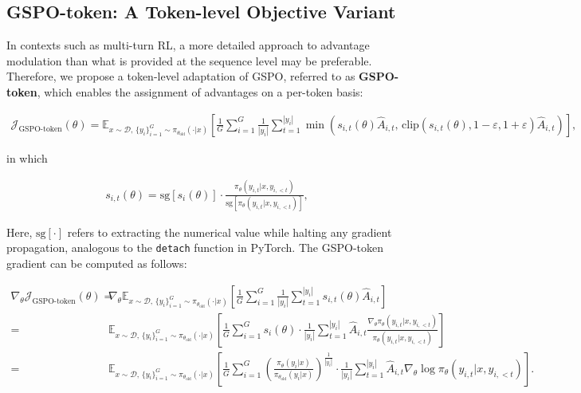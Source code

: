\subsection{GSPO-token: A Token-level Objective Variant}

In contexts such as multi-turn RL, a more detailed approach to advantage modulation than what is provided at the sequence level may be preferable. Therefore, we propose a token-level adaptation of GSPO, referred to as \textbf{GSPO-token}, which enables the assignment of advantages on a per-token basis:

\begin{align}
\mathcal{J}_\text{GSPO-token}(\theta)
=
\mathbb{E}_{ x \sim \mathcal{D},\, \{y_i\}_{i=1}^G \sim \pi_{\theta_\text{old}}( \cdot | x) }
\left[ 
\frac{1}{G} \sum_{i=1}^{G} \frac{1}{|y_i|} \sum_{t=1}^{|y_i|} 
\min \left( s_{i,t}(\theta) \widehat{A}_{i,t},  \, \mathrm{clip} \left( s_{i,t}(\theta), 1 - {\varepsilon}, 1 + {\varepsilon} \right) \widehat{A}_{i,t} \right) 
\right],
\label{equ:gspo-token}
\end{align}

in which

\begin{align}
s_{i,t}(\theta) 
= \mathrm{sg} \left[ s_{i}(\theta) \right]  \cdot \frac{ \pi_{\theta} (y_{i,t} | x, y_{i,<t}) }{ \mathrm{sg} \left[ \pi_{\theta} (y_{i,t} | x, y_{i,<t}) \right] },
\end{align}

Here, $\mathrm{sg}[\cdot]$ refers to extracting the numerical value while halting any gradient propagation, analogous to the \texttt{detach} function in PyTorch. The GSPO-token gradient can be computed as follows:

\begin{align}
\nabla_{\theta} \mathcal{J}_\text{GSPO-token}(\theta)
=&\ 
\nabla_{\theta} \mathbb{E}_{ x \sim \mathcal{D},\, \{y_i\}_{i=1}^G \sim \pi_{\theta_\text{old}}( \cdot | x) }
\left[ 
\frac{1}{G} \sum_{i=1}^{G}
\frac{1}{|y_i|} \sum_{t=1}^{|y_i|} 
s_{i,t}(\theta) \widehat{A}_{i,t}
\right] \\
=&\ 
\mathbb{E}_{ x \sim \mathcal{D},\, \{y_i\}_{i=1}^G \sim \pi_{\theta_\text{old}}( \cdot | x) }
\left[ 
\frac{1}{G} \sum_{i=1}^{G} s_i (\theta) \cdot \frac{1}{|y_i|} \sum_{t=1}^{|y_i|} 
\widehat{A}_{i,t} \frac{ \nabla_{\theta} \pi_{\theta} (y_{i,t} | x, y_{i,<t}) }{ \pi_{\theta} (y_{i,t} | x, y_{i,<t}) }
\right] \\
=&\ 
\mathbb{E}_{ x \sim \mathcal{D},\, \{y_i\}_{i=1}^G \sim \pi_{\theta_\text{old}}( \cdot | x) }
\left[ 
\frac{1}{G} \sum_{i=1}^{G}  \left( \frac{ \pi_{\theta} (y_i | x) }{ \pi_{\theta_\text{old}} (y_i | x)} \right)^{\frac{1}{|y_i|}}
\cdot \frac{1}{|y_i|} \sum_{t=1}^{|y_i|}
\widehat{A}_{i,t} \nabla_{\theta} \log \pi_{\theta} (y_{i,t} | x, y_{i,<t})  
\right].
\label{equ:gspo-token_grad}
\end{align}

